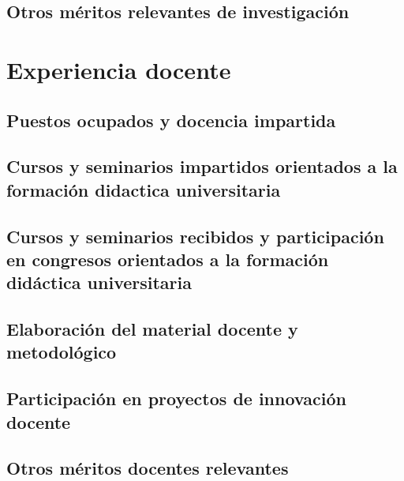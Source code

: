 \documentclass[14pt, article, twoside, a4paper]{memoir}
\begin{document}
\cleardoublepage
\chapter{Otros méritos relevantes de investigación}
\cleardoublepage 



\part{Experiencia docente}

\cleardoublepage
\chapter{Puestos ocupados y docencia impartida}
\cleardoublepage 


\cleardoublepage
\chapter{Cursos y seminarios impartidos orientados a la formación didactica universitaria}
\cleardoublepage 


\cleardoublepage
\chapter{Cursos y seminarios recibidos y participación en congresos orientados a la formación didáctica universitaria}
\cleardoublepage 


\cleardoublepage
\chapter{Elaboración del material docente y metodológico}
\cleardoublepage 

\cleardoublepage
\chapter{Participación en proyectos de innovación docente}
\cleardoublepage 

\cleardoublepage
\chapter{Otros méritos docentes relevantes}
\cleardoublepage 

\end{document}
